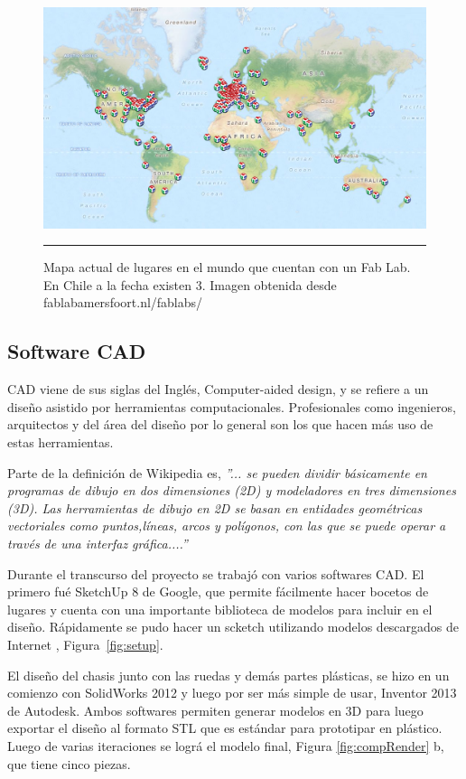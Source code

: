 \begin{figure}[htbp]
	\centering
		\includegraphics[width=\textwidth]{./Figures/map.png}
		\rule{35em}{0.5pt}
	\caption[Mapa fab labs en el mundo.]{Mapa actual de lugares en el mundo que cuentan con un Fab Lab. En Chile a la fecha existen 3. Imagen obtenida desde fablabamersfoort.nl/fablabs/}
	\label{fig:Fablabs}
\end{figure}	

\subsection{Software CAD}

CAD viene de sus siglas del Inglés, Computer-aided design, y se refiere a un diseño asistido por herramientas computacionales. Profesionales como ingenieros, arquitectos y del área del diseño por lo general son los que hacen más uso de estas herramientas.

Parte de la definición de Wikipedia es, \textit{”... se pueden dividir básicamente en programas de dibujo en dos dimensiones (2D) y modeladores en tres dimensiones (3D). Las herramientas de dibujo en 2D se basan en entidades geométricas vectoriales como puntos,líneas, arcos y polígonos, con las que se puede operar a través de una interfaz gráfica....”}

Durante el transcurso del proyecto se trabajó con varios softwares CAD. El primero fué SketchUp 8 de Google, que permite fácilmente hacer bocetos de lugares y cuenta con una importante biblioteca de modelos para incluir en el diseño. Rápidamente se pudo hacer un scketch utilizando modelos descargados de Internet , Figura~\ref{fig:setup}.

El diseño del chasis junto con las ruedas y demás partes plásticas, se hizo en un comienzo con SolidWorks 2012 y luego por ser más simple de usar, Inventor 2013 de Autodesk. Ambos softwares permiten generar modelos en 3D para luego exportar el diseño al formato STL que es estándar para prototipar en plástico. Luego de varias iteraciones se lográ el modelo final, Figura \ref{fig:compRender} b, que tiene cinco piezas. 


